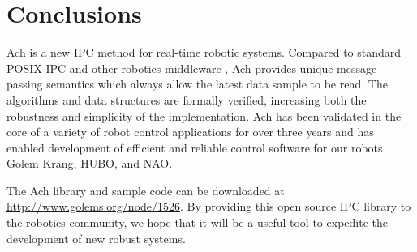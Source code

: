\documentclass[letterpaper]{IEEEtran}
\begin{document}
\section{Conclusions}
\label{sect:conclusion}

Ach is a new IPC method for real-time robotic systems.  Compared to
standard POSIX IPC and other robotics middleware
\cite{apue,Quigley09,agüero2010behavior}, Ach provides unique
message-passing semantics which always allow the latest data sample to
be read.  The algorithms and data structures are formally verified,
increasing both the robustness and simplicity of the implementation.
Ach has been validated in the core of a variety of robot control
applications for over three years and has enabled development of
efficient and reliable control software for our robots Golem Krang,
HUBO, and NAO.


The Ach library and sample code can be downloaded at
\url{http://www.golems.org/node/1526}.  By providing this open source
IPC library to the robotics community, we hope that it will be a
useful tool to expedite the development of new robust systems.






%


%
%
\end{document}
